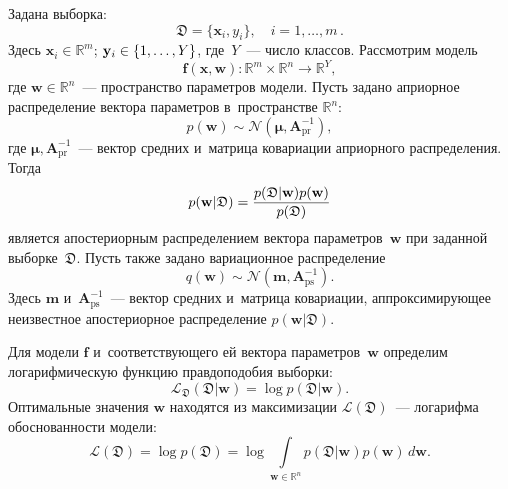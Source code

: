 \begin{multicols}{2}
Задана выборка:
$$
\mathfrak{D} = \{ \mathbf{x}_i, y_i\}, \quad i = 1,\dots, m\,.
$$
Здесь $\mathbf{x}_i \in \mathbb{R}^m$; $\mathbf{y}_i \hm\in \{1,\dots,Y\}$, где~$Y$~--- 
число классов. Рассмотрим модель
$$
\mathbf{f}(\mathbf{x},\mathbf{w}):\mathbb{R}^m \times \mathbb{R}^n 
\longrightarrow \mathbb{R}^Y,
$$
где $\mathbf{w} \in \mathbb{R}^n$~--- пространство параметров модели. Пусть 
задано априорное распределение вектора параметров в~пространстве  
$\mathbb{R}^n$:
$$
p(\mathbf{w}) \sim \mathcal{N} (\boldsymbol{\mu}, \mathbf{A}_{\mathrm{pr}}^{-
1}),
$$
где $\boldsymbol{\mu}, \mathbf{A}_{\mathrm{pr}}^{-1}$~--- вектор средних и~матрица 
ковариации априорного распределения. Тогда
$$
    p(\mathbf{w}|\mathfrak{D}) = \displaystyle\frac{\displaystyle p(\mathfrak{D} | \mathbf{w}) 
p(\mathbf{w})\mathstrut}{\displaystyle p(\mathfrak{D})\mathstrut}
$$
является апостериорным распределением вектора параметров~$\mathbf{w}$ при 
заданной выборке~$\mathfrak{D}$.  Пусть также задано вариационное распределение
$$
    q(\mathbf{w}) \sim \mathcal{N} (\mathbf{m},\mathbf{A}_{\mathrm{ps}}^{-1}).
$$
Здесь $\mathbf{m}$ и~$\mathbf{A}_{\mathrm{ps}}^{-1}$~--- вектор средних и~матрица 
ковариации, аппроксимирующее неизвестное апостериорное распределение 
$p(\mathbf{w}| \mathfrak{D})$.

Для модели $\mathbf{f}$ и~соответствующего ей вектора параметров~$\mathbf{w}$ 
определим логарифмическую функцию правдоподобия выборки:
\begin{equation*}
    \mathcal{L}_\mathfrak{D}(\mathfrak{D}|\mathbf{w}) = \log 
p(\mathfrak{D}|\mathbf{w}).
\end{equation*}
Оптимальные значения $\mathbf{w}$ находятся из максимизации 
$\mathcal{L}(\mathfrak{D})$~--- логарифма обоснованности модели:
\begin{equation}
    \mathcal{L}(\mathfrak{D}) = \log p(\mathfrak{D}) = \log 
\int\limits_{\mathbf{w}\in \mathbb{R}^n} p(\mathfrak{D}|\mathbf{w})p(\mathbf{w})\, 
d\mathbf{w}.
\label{eq_2}
\end{equation}


\end{multicols}
